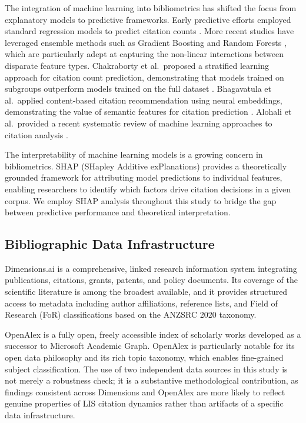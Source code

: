 \documentclass[12pt,a4paper]{article}
\begin{document}
The integration of machine learning into bibliometrics has shifted the focus from
explanatory models to predictive frameworks. Early predictive efforts employed
standard regression models to predict citation counts \citep{lokker2008prediction}.
More recent studies have leveraged ensemble methods such as Gradient Boosting
\citep{natekin2013gradient} and Random Forests \citep{breiman2001random}, which
are particularly adept at capturing the non-linear interactions between disparate
feature types. Chakraborty et al.\ proposed a stratified learning approach for
citation count prediction, demonstrating that models trained on subgroups outperform
models trained on the full dataset \citep{chakraborty2015towards}. Bhagavatula
et al.\ applied content-based citation recommendation using neural embeddings,
demonstrating the value of semantic features for citation prediction
\citep{bhagavatula2018content}. Alohali et al.\ provided a recent systematic
review of machine learning approaches to citation analysis \citep{alohali2022machine}.

The interpretability of machine learning models is a growing concern in
bibliometrics. SHAP (SHapley Additive exPlanations) \citep{lundberg2017unified}
provides a theoretically grounded framework for attributing model predictions to
individual features, enabling researchers to identify which factors drive citation
decisions in a given corpus. We employ SHAP analysis throughout this study to
bridge the gap between predictive performance and theoretical interpretation.

\subsection{Bibliographic Data Infrastructure}

Dimensions.ai \citep{herzog2020dimensions} is a comprehensive, linked research
information system integrating publications, citations, grants, patents, and policy
documents. Its coverage of the scientific literature is among the broadest
available, and it provides structured access to metadata including author
affiliations, reference lists, and Field of Research (FoR) classifications based
on the ANZSRC 2020 taxonomy.

OpenAlex \citep{priem2022openalex} is a fully open, freely accessible index of
scholarly works developed as a successor to Microsoft Academic Graph. OpenAlex
is particularly notable for its open data philosophy and its rich topic taxonomy,
which enables fine-grained subject classification. The use of two independent data
sources in this study is not merely a robustness check; it is a substantive
methodological contribution, as findings consistent across Dimensions and OpenAlex
are more likely to reflect genuine properties of LIS citation dynamics rather than
artifacts of a specific data infrastructure.
\end{document}
